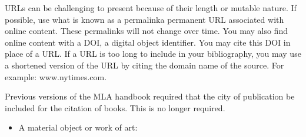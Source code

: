 \noindent URLs can be challenging to present because of their length or mutable nature. If possible, use what is known as a permalink\textemdash a permanent URL associated with online content. These permalinks will not change over time. You may also find online content with a DOI, a digital object identifier. You may cite this DOI in place of a URL. If a URL is too long to include in your bibliography, you may use a shortened version of the URL by citing the domain name of the source. For example: www.nytimes.com.


\begin{center}
\begin{tcolorbox}[colframe=oyster, coltitle=black, sharp corners, title=\ding{52} Note]

Previous versions of the MLA handbook required that the city of publication be included for the citation of books. This is no longer required. 


\end{tcolorbox}
\end{center}




\begin{itemize}
\item A material object or work of art:
\end{itemize}

